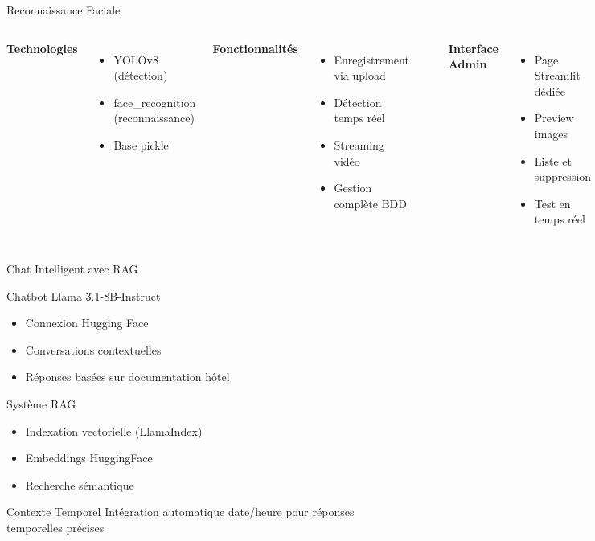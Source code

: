 \documentclass[aspectratio=169,11pt]{beamer}
\begin{document}
\begin{frame}{Reconnaissance Faciale}
\begin{columns}
\textbf{Technologies}
\begin{itemize}
    \item YOLOv8 (détection)
    \item face\_recognition (reconnaissance)
    \item Base pickle
\end{itemize}

\vspace{0.5cm}

\textbf{Fonctionnalités}
\begin{itemize}
    \item Enregistrement via upload
    \item Détection temps réel
    \item Streaming vidéo
    \item Gestion complète BDD
\end{itemize}

\begin{center}
\Large
\textcolor{primaryblue}{\faUser\ \faCheckCircle}
\end{center}

\textbf{Interface Admin}
\begin{itemize}
    \item Page Streamlit dédiée
    \item Preview images
    \item Liste et suppression
    \item Test en temps réel
\end{itemize}
\end{columns}
\end{frame}

\begin{frame}{Chat Intelligent avec RAG}
\begin{block}{Chatbot Llama 3.1-8B-Instruct}
\begin{itemize}
    \item Connexion Hugging Face
    \item Conversations contextuelles
    \item Réponses basées sur documentation hôtel
\end{itemize}
\end{block}

\begin{block}{Système RAG}
\begin{itemize}
    \item Indexation vectorielle (LlamaIndex)
    \item Embeddings HuggingFace
    \item Recherche sémantique
\end{itemize}
\end{block}

\begin{block}{Contexte Temporel}
Intégration automatique date/heure pour réponses temporelles précises
\end{block}
\end{frame}
\end{document}
